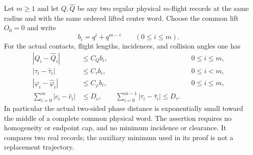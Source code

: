 \begin{lemma}
\label{lem:xd-paired-records}
Let $m\ge1$ and let $Q,\widehat Q$ be any two regular physical
$m$-flight records at the same radius and with the same ordered lifted
center word.  Choose the common lift $O_0=0$ and write
\[
 b_i=q^i+q^{m-i}\qquad(0\le i\le m).
\]
For the actual contacts, flight lengths, incidences, and collision
angles one has
\begin{align}
 |Q_i-\widehat Q_i|&\le C_Qb_i,
                                      &&0\le i\le m,
                                  \label{eq:xd-contact}\\
 |\tau_i-\widehat\tau_i|&\le C_\tau b_i,
                                      &&0\le i<m,
                                  \label{eq:xd-flight}\\
 |\varphi_i-\widehat\varphi_i|
       &\le C_\varphi b_i,
                                      &&0\le i\le m,
                                  \label{eq:xd-phase}\\
 \sum_{i=0}^m|c_i-\widehat c_i|&\le D_c,
 \qquad
 \sum_{i=0}^{m-1}|\tau_i-\widehat\tau_i|\le D_\tau.
                                  \label{eq:xd-summed-data}
\end{align}
In particular the actual two-sided phase distance is exponentially
small toward the middle of a complete common physical word.
The assertion requires no homogeneity or endpoint cap, and no minimum
incidence or clearance.  It compares two real records; the auxiliary
minimum used in its proof is not a replacement trajectory.
\end{lemma}

